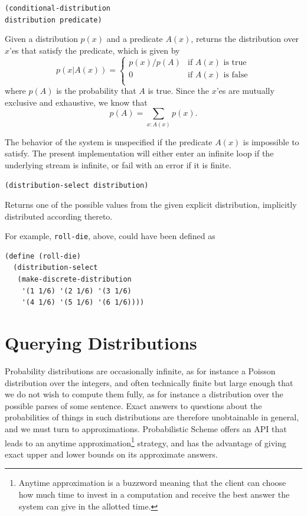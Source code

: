 \documentclass[10pt]{sigplanconf}
\newcommand{\code}[1]{\texttt{#1}}
\newcommand{\startor}{\left\{ \begin{array}{ll}}
\newcommand{\stopor}{\end{array} \right.}
\newenvironment{documentation}[1]{\vspace{5pt} \noindent \texttt{#1} \nopagebreak \begin{list}{}{\leftmargin 0.7cm}\item}{\end{list}}
\begin{document}
\begin{documentation}{(conditional-distribution \\ \mbox{} distribution predicate)}
Given a distribution $p(x)$ and a predicate $A(x)$, returns the distribution
over $x$'es that satisfy the predicate, which
is given by
\[ p(x|A(x)) = \startor
p(x) / p(A) &    \textrm{if $A(x)$ is true} \\
0 &              \textrm{if $A(x)$ is false} \\
\stopor \]
where $p(A)$ is the probability that $A$ is true.  Since the $x$'es are
mutually exclusive and exhaustive, we know that
\[ p(A) = \sum_{x:A(x)} p(x). \]
\end{documentation}

The behavior of the system is unspecified if the predicate $A(x)$ is
impossible to satisfy.  The present implementation
will either enter an infinite loop if the underlying
stream is infinite, or fail with an error if it is
finite.

\begin{documentation}{(distribution-select distribution)}
Returns one of the possible values from the given explicit
distribution, implicitly distributed according thereto.
\end{documentation}

For example, \code{roll-die}, above, could have been defined as
\begin{verbatim}
(define (roll-die)
  (distribution-select
   (make-discrete-distribution
    '(1 1/6) '(2 1/6) '(3 1/6)
    '(4 1/6) '(5 1/6) '(6 1/6))))
\end{verbatim}

\section{Querying Distributions}
\label{querying}

Probability distributions are occasionally infinite, as for instance a
Poisson distribution over the integers, and often
technically finite but large enough that we do not wish to compute
them fully, as for instance a distribution over the possible parses
of some sentence.  Exact answers to questions about the probabilities
of things in such distributions are therefore unobtainable in general,
and we must turn to approximations.  Probabilistic Scheme offers
an API that leads to an anytime approximation\footnote{Anytime 
approximation is a buzzword meaning that the client can choose how much
time to invest in a computation and receive the best answer the 
system can give in the allotted time.} strategy, and has the 
advantage of giving exact upper and lower bounds on its approximate
answers.
\end{document}
